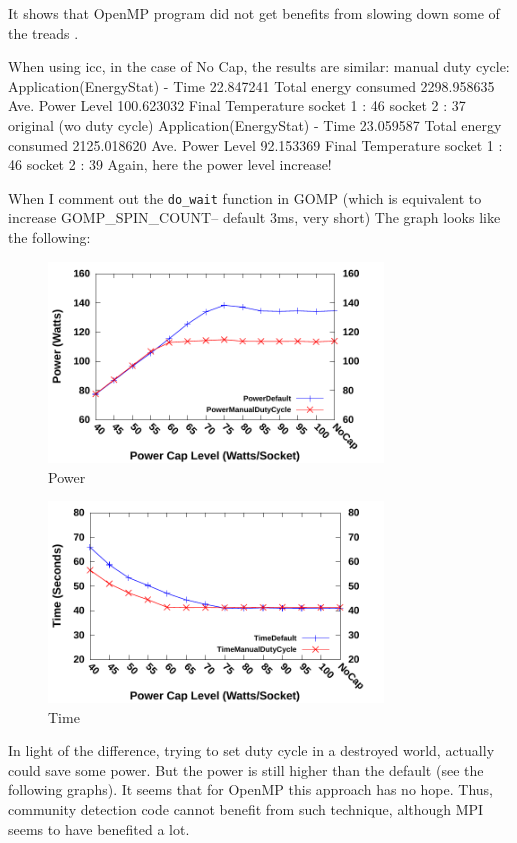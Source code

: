 It shows that OpenMP program did not get benefits from slowing down some of the 
treads .

When using icc, in the case of No Cap, the results are similar:
manual duty cycle:
Application(EnergyStat) - Time 22.847241 Total energy consumed 2298.958635 Ave. Power Level 100.623032 Final Temperature socket 1 : 46  socket 2 : 37
original (wo duty cycle)
Application(EnergyStat) - Time 23.059587 Total energy consumed 2125.018620 Ave. Power Level 92.153369 Final Temperature socket 1 : 46  socket 2 : 39
Again, here the power level increase!

When I comment out the \texttt{do\_wait} function in GOMP (which is equivalent to increase GOMP\_SPIN\_COUNT-- default 3ms, very short)
The graph looks like  the following: 


\begin{figure}[bt]
    \includegraphics[width=3.5in]{fake-power.pdf}
    \caption{Power }
    \label{fig:Unbalanced-fake}
\end{figure}
\begin{figure}[bt]
    \includegraphics[width=3.5in]{fake-time.pdf}
    \caption{Time}
    \label{fig:UnbalancedTime-fake}
\end{figure}

In light of the difference, trying to set duty cycle in a destroyed world, actually could save some power.
But the power is still higher than the default (see the following graphs). 
It seems that for OpenMP this approach has no hope. 
Thus, community detection code cannot benefit from such technique, although MPI seems to have benefited a lot. 


